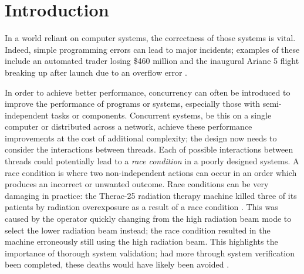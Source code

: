 \section{Introduction}


In a world reliant on computer systems, the correctness of those systems is vital. Indeed, simple programming errors can lead to major incidents; examples of these include an automated trader losing \$460 million \cite{KnightCapital} and the inaugural Ariane 5 flight breaking up after launch due to an overflow error \cite{Flight501Failure}. 

In order to achieve better performance, concurrency can often be introduced to improve the performance of programs or systems, especially those with semi-independent tasks or components.
Concurrent systems, be this on a single computer or distributed across a network, achieve these performance improvements at the cost of additional complexity; the design now needs to consider the interactions between threads. 
Each of possible interactions between threads could potentially lead to a \emph{race condition} in a poorly designed systems. A race condition is where two non-independent actions can occur in an order which produces an incorrect or unwanted outcome. 
Race conditions can be very damaging in practice: the Therac-25 radiation therapy machine killed three of its patients by radiation overexposure as a result of a race condition \cite{BugSnag}. This was caused by the operator quickly changing from the high radiation beam mode to select the lower radiation beam instead; the race condition resulted in the machine erroneously still using the high radiation beam. This highlights the importance of thorough system validation; had more through system verification been completed, these deaths would have likely been avoided \cite{AGift}.



